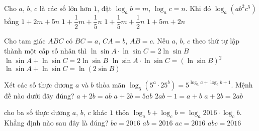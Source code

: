 \begin{ex}
	Cho $a$, $b$, $c$ là các số lớn hơn $1$, đặt $\log_ab=m$, $\log_ac=n$. Khi đó $\log_a\left(ab^2c^5\right)$ bằng
	\choice
	{\True $1+2m+5n$}
	{$1+\dfrac{1}{2}m+\dfrac{1}{5}n$}
	{$1+\dfrac{1}{5}m+\dfrac{1}{2}n$}
	{$1+5m+2n$}
\end{ex}
\begin{ex}
	Cho tam giác $ABC$ có $BC=a$, $CA=b$, $AB=c$. Nếu $a$, $b$, $c$ theo thứ tự lập thành một cấp số nhân thì
	\choice
	{$\ln\sin A\cdot\ln\sin C=2\ln\sin B$}
	{\True $\ln\sin A+\ln\sin C=2\ln\sin B$}
	{$\ln\sin A\cdot\ln\sin C=(\ln\sin B)^2$}
	{$\ln\sin A+\ln\sin C=\ln(2\sin B)$}
\end{ex}
\begin{ex}
	Xét các số thực dương $a$ và $b$ thỏa mãn $\log_5\left(5^a\cdot 25^b\right)=5^{\log_5a+\log_5b+1}$. Mệnh đề nào dưới đây đúng?
	\choice
	{$a+2b=ab$}
	{\True $a+2b=5ab$}
	{$2ab-1=a+b$}
	{$a+2b=2ab$}
\end{ex}
\begin{ex}
	cho ba số thực dương $a$, $b$, $c$ khác $1$ thỏa $\log_a b + \log_c b = \log_a 2016 \cdot \log_c b$. Khẳng định nào sau đây là đúng?	
	\choice
	{$bc=2016$}
	{$ab=2016$}
	{\True $ac=2016$}
	{$abc=2016$}
\end{ex}
